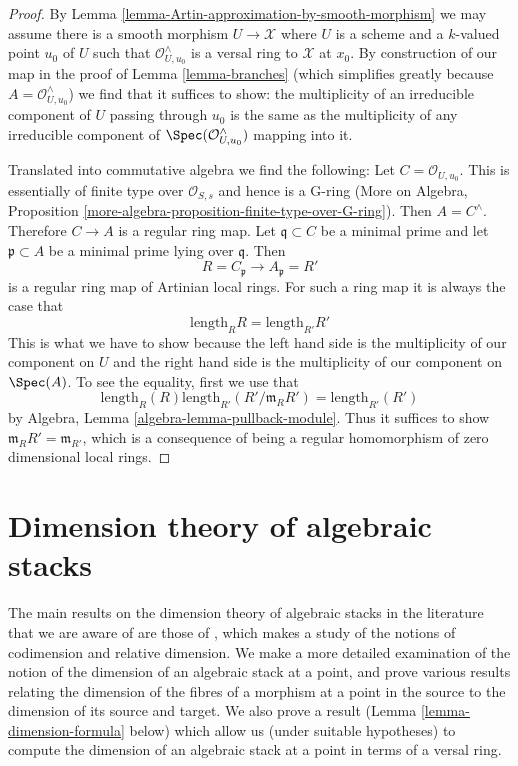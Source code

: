 \begin{proof}
By Lemma \ref{lemma-Artin-approximation-by-smooth-morphism} we
may assume there is a smooth morphism $U \to \mathcal{X}$
where $U$ is a scheme and a $k$-valued point $u_0$ of $U$
such that $\mathcal{O}_{U, u_0}^\wedge$ is a versal ring to
$\mathcal{X}$ at $x_0$. By construction of our map in
the proof of Lemma \ref{lemma-branches} (which simplifies
greatly because $A = \mathcal{O}_{U, u_0}^\wedge$) we find
that it suffices to show: the multiplicity of an irreducible
component of $U$ passing through $u_0$ is the same as the
multiplicity of any irreducible component of
$\Spec(\mathcal{O}_{U, u_0}^\wedge)$ mapping into it.

\medskip\noindent
Translated into commutative algebra we find the following:
Let $C = \mathcal{O}_{U, u_0}$. This is essentially of finite type
over $\mathcal{O}_{S, s}$ and hence is a G-ring (More on Algebra,
Proposition \ref{more-algebra-proposition-finite-type-over-G-ring}).
Then $A = C^\wedge$. Therefore $C \to A$ is a regular ring map.
Let $\mathfrak q \subset C$ be a minimal prime and let $\mathfrak p \subset A$
be a minimal prime lying over $\mathfrak q$. Then
$$
R = C_\mathfrak p \longrightarrow A_\mathfrak p = R'
$$
is a regular ring map of Artinian local rings. For such a ring map
it is always the case that
$$
\text{length}_R R = \text{length}_{R'} R'
$$
This is what we have to show because the left hand side
is the multiplicity of our component on $U$ and the right hand
side is the multiplicity of our component on $\Spec(A)$.
To see the equality, first we use that
$$
\text{length}_R(R) \text{length}_{R'}(R'/\mathfrak m_R R') =
\text{length}_{R'}(R')
$$
by Algebra, Lemma \ref{algebra-lemma-pullback-module}. Thus it suffices
to show $\mathfrak m_R R' = \mathfrak m_{R'}$, which is a consequence
of being a regular homomorphism of zero dimensional local rings.
\end{proof}













\section{Dimension theory of algebraic stacks}
\label{section-dimension-of-algebraic-stacks}

\noindent
The main results on the dimension theory of algebraic stacks in the
literature that we are aware of are those of \cite{Osserman}, which
makes a study of the notions of codimension and relative dimension. We
make a more detailed examination of the notion of the dimension of an
algebraic stack at a point, and prove various results
relating the dimension of the fibres of a morphism at a point in the source
to the dimension of its source and target.  We also prove a result
(Lemma \ref{lemma-dimension-formula} below) which
allow us (under suitable hypotheses) to compute the dimension of
an algebraic stack at a point in terms of a versal ring.

